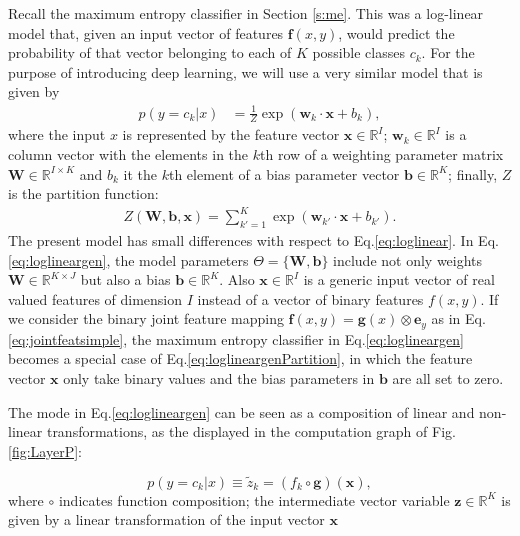 Recall the maximum entropy classifier in Section \ref{s:me}. This was a log-linear
model that, given an input vector of features $\boldsymbol{f}(x,y)$, would
predict the probability of that vector belonging to each of $K$ possible
classes $c_k$. %
 For the purpose of introducing deep learning, 
 we will use a very similar model that is given by
%
\begin{align}
p(y=c_k|{x}) & = \frac{1}{Z}\exp(\mathbf{w}_k \cdot \mathbf{x} + b_k),
\label{eq:loglineargen}
\end{align}
%
%
where the input $x$ is represented by the feature vector $\mathbf{x} \in \mathbb{R}^{I}$; $\mathbf{w}_k \in \mathbb{R}^{I}$ is a column vector with the elements in the $k${th} row of a weighting parameter matrix $\textbf{W} \in \mathbb{R}^{I \times K}$ and $b_k$ it the $k$th element of a bias parameter vector $\textbf{b} \in \mathbb{R}^{K}$; finally, $Z$ is the partition function:
\begin{align}
Z(\mathbf{W},\mathbf{b},\mathbf{x}) = \sum_{k'=1}^{K} \exp(\mathbf{w}_{k'} \cdot \mathbf{x} + b_{k'}). 
\label{eq:loglineargenPartition}
\end{align}
%
The present model has small differences with respect to  Eq.\ref{eq:loglinear}. In Eq.\ref{eq:loglineargen}, the model
parameters $\Theta=\{\mathbf{W}, \mathbf{b}\}$ include not only weights $\mathbf{W} \in \mathbb{R}^{K \times J}$ but also a bias $\mathbf{b} \in
\mathbb{R}^{K}$. Also $\mathbf{x} \in \mathbb{R}^{I}$ is a
generic input vector of real valued features of dimension $I$ instead of a vector of binary features $f(x,y)$. If we consider the binary
joint feature mapping $\boldsymbol{f}(x,y) = \boldsymbol{g}(x) \otimes \boldsymbol{e}_y\nonumber$ as in Eq.\ref{eq:jointfeatsimple}, the maximum entropy classifier in Eq.\ref{eq:loglineargen}
becomes a special case of Eq.\ref{eq:loglineargenPartition}, in which the feature vector $\mathbf{x}$ only take binary values and the bias parameters in $\mathbf{b}$ are all set to zero.

\noindent The mode in  Eq.\ref{eq:loglineargen} can be seen as a composition of
linear and non-linear transformations, as the displayed in the computation graph of Fig.\ref{fig:LayerP}:

\begin{equation}
p(y=c_k|{x}) \equiv \tilde{z}_k = (f_k \circ \mathbf{g})(\mathbf{x}),
\end{equation}
%
where $\circ$ indicates function composition; the intermediate vector variable $\mathbf{z} \in \mathbb{R}^{K}$ is given by a linear transformation of the input vector $\mathbf{x}$

